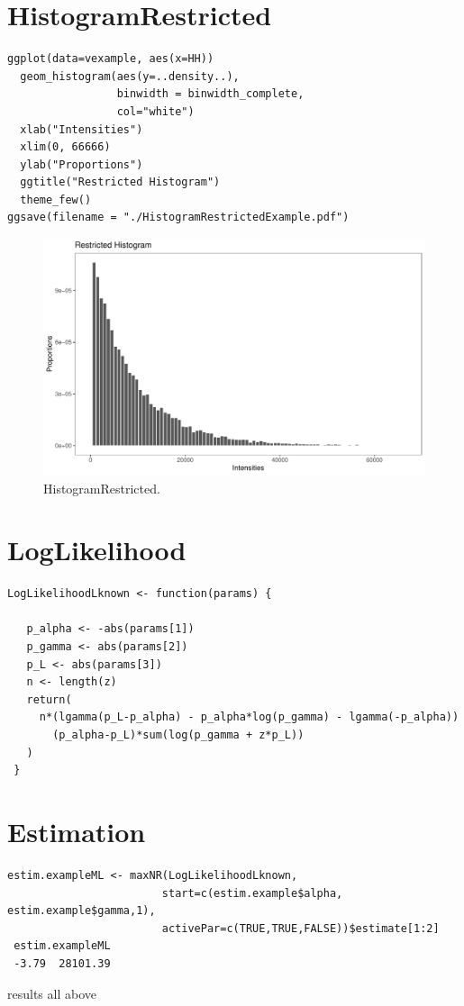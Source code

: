 \documentclass{article}
\begin{document}
\section{HistogramRestricted}
\begin{lstlisting}[frame=tb]
  ggplot(data=vexample, aes(x=HH)) 
  geom_histogram(aes(y=..density..), 
                 binwidth = binwidth_complete,
                 col="white")  
  xlab("Intensities") 
  xlim(0, 66666) 
  ylab("Proportions") 
  ggtitle("Restricted Histogram") 
  theme_few()
ggsave(filename = "./HistogramRestrictedExample.pdf")
\end{lstlisting}

\begin{figure}
	\centering
	\includegraphics[width=0.5\linewidth]{HistogramRestrictedExample}
	\caption{HistogramRestricted.}
	\label{fig:HistogramExample}
\end{figure}

\section{LogLikelihood}
\begin{lstlisting}[frame=tb]
 LogLikelihoodLknown <- function(params) {
   
   p_alpha <- -abs(params[1])
   p_gamma <- abs(params[2])
   p_L <- abs(params[3])
   n <- length(z)
   return(
     n*(lgamma(p_L-p_alpha) - p_alpha*log(p_gamma) - lgamma(-p_alpha))  
       (p_alpha-p_L)*sum(log(p_gamma + z*p_L)) 
   )
 }
\end{lstlisting}
\section{Estimation}
\begin{lstlisting}[frame=tb]
 estim.exampleML <- maxNR(LogLikelihoodLknown, 
                        start=c(estim.example$alpha, estim.example$gamma,1), 
                        activePar=c(TRUE,TRUE,FALSE))$estimate[1:2]
 estim.exampleML
 -3.79  28101.39
\end{lstlisting}
results all above
\end{document}
